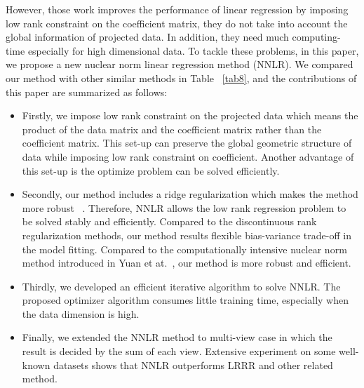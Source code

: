 \documentclass{ieeeaccess}
\begin{document}
However, those work improves the performance of linear regression by imposing low rank constraint on the coefficient matrix, they do not take into account the global information of projected data. In addition, they need much computing-time especially for high dimensional data. To tackle these problems, in this paper, we propose a new nuclear norm linear regression method (NNLR). We compared our method with other similar methods in Table ~\ref{tab8}, and the contributions of this paper are summarized as follows:


\begin{itemize}
  \item Firstly, we impose low rank constraint on the projected data which means the product of the data matrix and the coefficient matrix rather than the coefficient matrix. This set-up can preserve the global geometric structure of data while imposing low rank constraint on coefficient. Another advantage of this set-up is the optimize problem can be solved efficiently.
  \item Secondly, our method includes a ridge regularization which makes the method more robust ~\cite{ref19,ref25}. Therefore, NNLR allows the low rank regression problem to be solved stably and efficiently. Compared to the discontinuous rank regularization methods, our method results flexible bias-variance trade-off in the model fitting. Compared to the computationally intensive nuclear norm method introduced in Yuan et at.~\cite{ref02}, our method is more robust and efficient.
  \item Thirdly, we developed an efficient iterative algorithm to solve NNLR. The proposed optimizer algorithm consumes little training time, especially when the data dimension is high.
  \item Finally, we extended the NNLR method to multi-view case in which the result is decided by the sum of each view. Extensive experiment on some well-known datasets shows that NNLR outperforms LRRR and other related method.
\end{itemize}
\end{document}
